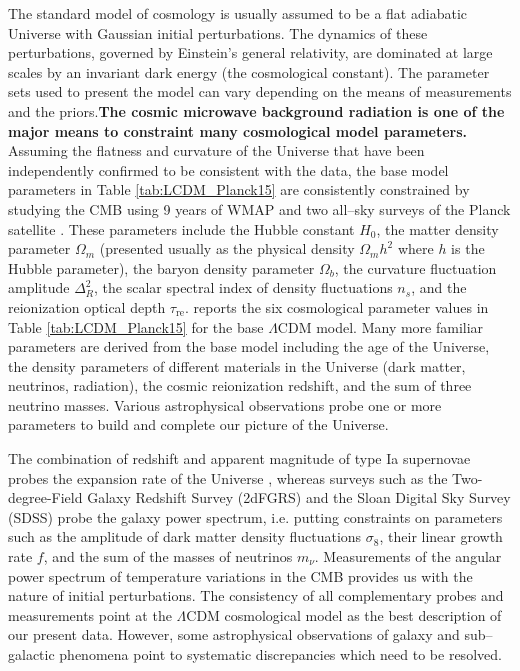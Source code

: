 \documentclass[a4wide,12pt]{book}
\begin{document}
The standard model of cosmology is usually assumed to be a flat adiabatic Universe with Gaussian initial perturbations. The dynamics of these perturbations, governed by Einstein's general relativity, are dominated at large scales by an invariant dark energy (the cosmological constant). The parameter sets used to present the model can vary depending on the means of measurements and the priors.{\bf  The cosmic microwave background radiation is one of the major means to constraint many cosmological model parameters.} Assuming the flatness and curvature of the Universe that have been independently confirmed to be consistent with the data, the base model parameters in Table \ref{tab:LCDM_Planck15} are consistently constrained by studying the CMB using 9 years of WMAP \citep[][]{WMAP9} and two all--sky surveys of the Planck satellite \citep[][]{Planck2015}. These parameters include the Hubble constant $H_0$, the matter density parameter $\Omega_m$ (presented usually as the physical density $\Omega_m h^2$ where $h$ is the Hubble parameter), the baryon density parameter $\Omega_b$, the curvature fluctuation amplitude $\Delta^2_R$, the scalar spectral index of density fluctuations $n_s$, and the reionization optical depth $\tau_\mathrm{re}$. \citet[][]{Planck2015} reports the six cosmological parameter values in Table \ref{tab:LCDM_Planck15} for the base $\Lambda$CDM model. Many more familiar parameters are derived from the base model including the age of the Universe, the density parameters of different materials in the Universe (dark matter, neutrinos, radiation), the cosmic reionization redshift, and the sum of three neutrino masses. Various astrophysical observations probe one or more parameters to build and complete our picture of the Universe.

The combination of redshift and apparent magnitude of type Ia supernovae probes the expansion rate of the Universe \citep[][]{Riess+1998, Perlmutter+1999}, whereas surveys such as the Two-degree-Field Galaxy Redshift Survey (2dFGRS) \citep[][]{2dFGRS} and the Sloan Digital Sky Survey (SDSS) \citep[][]{SDSS} probe the galaxy power spectrum, i.e. putting constraints on parameters such as the amplitude of dark matter density fluctuations $\sigma_8$, their linear growth rate $f$, and the sum of the masses of neutrinos $m_\nu$. Measurements of the angular power spectrum of temperature variations in the CMB \citep[COBE, WMAP, Planck][]{} provides us with the nature of initial perturbations. The consistency of all complementary probes and measurements point at the $\Lambda$CDM cosmological model as the best description of our present data. However, some astrophysical observations of galaxy and sub--galactic phenomena point to systematic discrepancies which need to be resolved.
\end{document}
